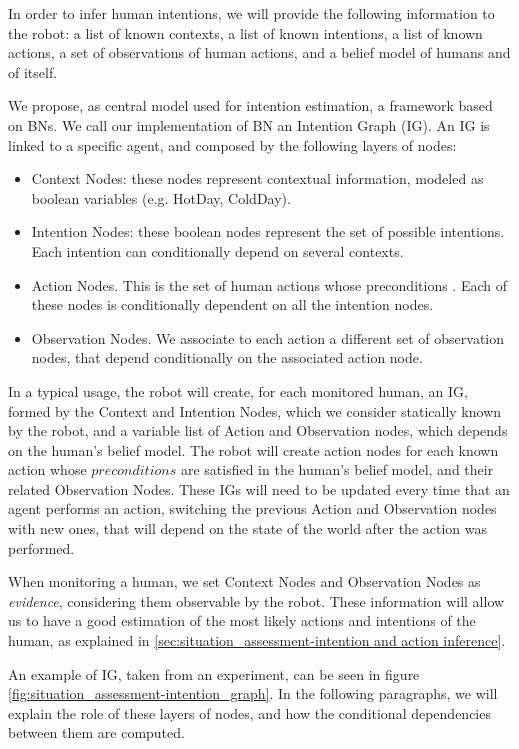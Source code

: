 In order to infer human intentions, we will provide the following information to the robot: a list of known contexts, a list of known intentions, a list of known actions, a set of observations of human actions, and a belief model of humans and of itself.

We propose, as central model used for intention estimation, a framework based on BNs. We call our implementation of BN an Intention Graph (IG).
An IG is linked to a specific agent, and composed by the following layers of nodes:
\begin{itemize}
\item Context Nodes: these nodes represent contextual information, modeled as boolean variables (e.g. HotDay, ColdDay).
\item Intention Nodes: these boolean nodes represent the set of possible intentions. Each intention can conditionally depend on several contexts.
\item Action Nodes. This is the set of human actions whose preconditions . Each of these nodes is conditionally dependent on all the intention nodes. 
\item Observation Nodes. We associate to each action a different set of observation nodes, that depend conditionally on the associated action node. 
\end{itemize}

In a typical usage, the robot will create, for each monitored human, an IG, formed by the Context and Intention Nodes, which we consider statically known by the robot, and a variable list of Action and Observation nodes, which depends on the human's belief model. The robot will create action nodes for each known action whose $preconditions$ are satisfied in the human's belief model, and their related Observation Nodes. These IGs will need to be updated every time that an agent performs an action, switching the previous Action and Observation nodes with new ones, that will depend on the state of the world after the action was performed.

When monitoring a human, we set Context Nodes and Observation Nodes as \textit{evidence}, considering them observable by the robot. These information will allow us to have a good estimation of the most likely actions and intentions of the human, as explained in \ref{sec:situation_assessment-intention and action inference}. 


An example of IG, taken from an experiment, can be seen in figure \ref{fig:situation_assessment-intention_graph}. In the following paragraphs, we will explain the role of these layers of nodes, and how the conditional dependencies between them are computed.

